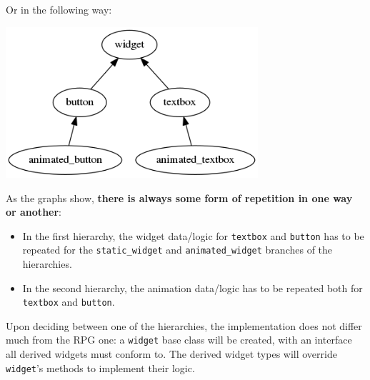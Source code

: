 \documentclass[oneside, 12pt, a4paper, openany]{book}
\let\origfigure=\figure
\let\endorigfigure=\endfigure
\renewenvironment{figure}[1][]{%
\origfigure[H]
}{%
\endorigfigure
}
\begin{document}
Or in the following way:

\begin{figure}[htbp]
\centering
\includegraphics[width=0.70000\textwidth]{source/figures/generated/ecs/overview/oop/repetition_problem_2.png}
\caption{OOP encoding issue: repetition \#2}
\end{figure}

As the graphs show, \textbf{there is always some form of repetition in
one way or another}:

\begin{itemize}
\item
  In the first hierarchy, the widget data/logic for
  \texttt{textbox}
  and
  \texttt{button}
  has to be repeated for the
  \texttt{static_widget}
  and
  \texttt{animated_widget}
  branches of the hierarchies.
\item
  In the second hierarchy, the animation data/logic has to be repeated
  both for
  \texttt{textbox}
  and
  \texttt{button}.
\end{itemize}

Upon deciding between one of the hierarchies, the implementation does
not differ much from the RPG one: a
\texttt{widget}
base class will be created, with an interface all derived widgets must
conform to. The derived widget types will override
\texttt{widget}'s
methods to implement their logic.
\end{document}
